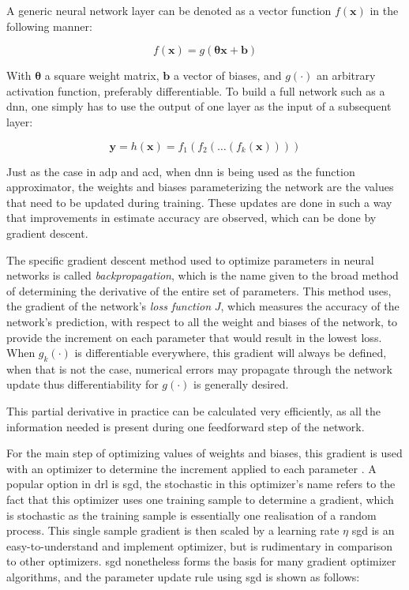 \documentclass[../report.tex]{subfiles}
\begin{document}
A generic neural network layer can be denoted as a vector function $f(\mathbf{x})$ in the following manner:

\begin{equation}\label{eq:generic_layer}
    f(\mathbf{x}) = g(\boldsymbol{\theta}\mathbf{x} + \mathbf{b})
\end{equation}

With $\boldsymbol{\theta}$ a square weight matrix, $\mathbf{b}$ a vector of biases, and $g(\cdot)$ an arbitrary activation function, preferably differentiable. To build a full network such as a \ac{dnn}, one simply has to use the output of one layer as the input of a subsequent layer:

\begin{equation}\label{eq:generic_dnn}
    \mathbf{y} = h(\mathbf{x}) = f_1(f_2(\dots(f_k(\mathbf{x}))))
\end{equation}

Just as the case in \ac{adp} and \ac{acd}, when \ac{dnn} is being used as the function approximator, the weights and biases parameterizing the network are the values that need to be updated during training. These updates are done in such a way that improvements in estimate accuracy are observed, which can be done by gradient descent.

The specific gradient descent method used to optimize parameters in neural networks is called \textit{backpropagation}, which is the name given to the broad method of determining the derivative of the entire set of parameters. This method uses, the gradient of the network's \textit{loss function} $J$, which measures the accuracy of the network's prediction, with respect to all the weight and biases of the network, to provide the increment on each parameter that would result in the lowest loss. When $g_k(\cdot)$ is differentiable everywhere, this gradient will always be defined, when that is not the case, numerical errors may propagate through the network update thus differentiability for $g(\cdot)$ is generally desired.

This partial derivative in practice can be calculated very efficiently, as all the information needed is present during one feedforward step of the network.

For the main step of optimizing values of weights and biases, this gradient is used with an optimizer to determine the increment applied to each parameter \cite{gradient_optimizers}. A popular option in \ac{drl} is \ac{sgd}, the stochastic in this optimizer's name refers to the fact that this optimizer uses one training sample to determine a gradient, which is stochastic as the training sample is essentially one realisation of a random process. This single sample gradient is then scaled by a learning rate $\eta$  \ac{sgd} is an easy-to-understand and implement optimizer, but is rudimentary in comparison to other optimizers. \ac{sgd} nonetheless forms the basis for many gradient optimizer algorithms, and the parameter update rule using \ac{sgd} is shown as follows:
\end{document}
